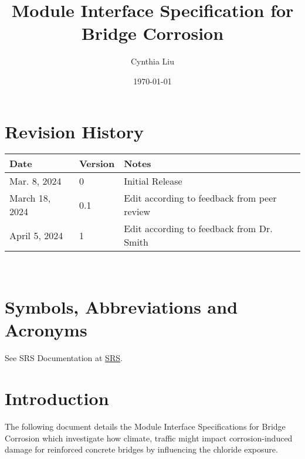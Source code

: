 \documentclass[12pt, titlepage]{article}
\begin{document}
\title{Module Interface Specification for Bridge Corrosion}

\author{Cynthia Liu}

\date{\today}

\maketitle


\section{Revision History}

\begin{tabularx}{\textwidth}{p{3cm}p{2cm}X}
\toprule {\bf Date} & {\bf Version} & {\bf Notes}\\
\midrule
Mar. 8, 2024 & 0 & Initial Release\\
March 18, 2024 & 0.1 & Edit according to feedback from peer review \\
April 5, 2024 & 1 & Edit according to feedback from Dr. Smith\\
\bottomrule
\end{tabularx}

~\newpage

\section{Symbols, Abbreviations and Acronyms}

See SRS Documentation at \href{https://github.com/CynthiaLiu0805/BridgeCorrosion/blob/main/docs/SRS/SRS.pdf}{SRS}.


\newpage

\tableofcontents

\newpage


\section{Introduction}

The following document details the Module Interface Specifications for Bridge Corrosion which investigate how climate, traffic might impact corrosion-induced
damage for reinforced concrete bridges by influencing the chloride exposure.
\end{document}
